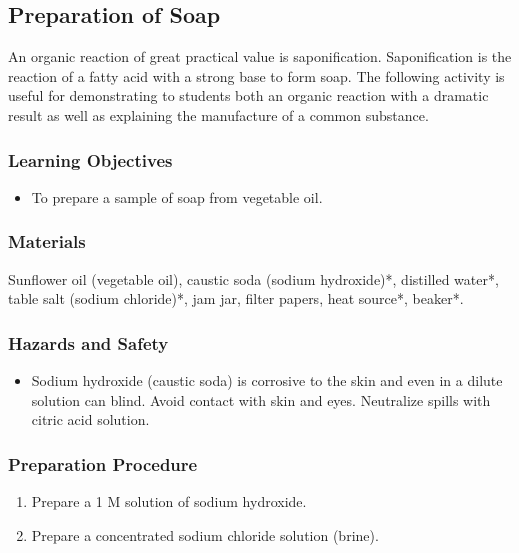 \subsection{Preparation of Soap}

An organic reaction of great practical value is saponification. Saponification is the reaction of a fatty acid with a strong base to form soap. The following activity is useful for demonstrating to students both an organic reaction with a dramatic result as well as explaining the manufacture of a common substance.

\subsubsection*{Learning Objectives}
\begin{itemize}
\item{To prepare a sample of soap from vegetable oil.}
\end{itemize}

\subsubsection*{Materials}
Sunflower oil (vegetable oil), caustic soda (sodium hydroxide)*, distilled water*, table salt (sodium chloride)*, jam jar, filter papers, heat source*, beaker*.

\subsubsection*{Hazards and Safety}
\begin{itemize}
\item{Sodium hydroxide (caustic soda) is corrosive to the skin and even in a dilute solution can blind. Avoid contact with skin and eyes. Neutralize spills with citric acid solution.}
\end{itemize}

\subsubsection*{Preparation Procedure}
\begin{enumerate}
\item{Prepare a 1 M solution of sodium hydroxide.}
\item{Prepare a concentrated sodium chloride solution (brine).}
\end{enumerate}

